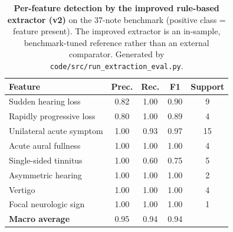 \begin{table}[htbp]
\centering
\caption{\textbf{Per-feature detection by the improved rule-based extractor (v2)} on the 37-note benchmark (positive class = feature present). The improved extractor is an in-sample, benchmark-tuned reference rather than an external comparator. Generated by \texttt{code/src/run\_extraction\_eval.py}.}
\label{tab:extraction}
\small
\begin{tabular}{lcccc}
\toprule
Feature & Prec. & Rec. & F1 & Support \\
\midrule
Sudden hearing loss & 0.82 & 1.00 & 0.90 & 9 \\
Rapidly progressive loss & 0.80 & 1.00 & 0.89 & 4 \\
Unilateral acute symptom & 1.00 & 0.93 & 0.97 & 15 \\
Acute aural fullness & 1.00 & 1.00 & 1.00 & 4 \\
Single-sided tinnitus & 1.00 & 0.60 & 0.75 & 5 \\
Asymmetric hearing & 1.00 & 1.00 & 1.00 & 2 \\
Vertigo & 1.00 & 1.00 & 1.00 & 4 \\
Focal neurologic sign & 1.00 & 1.00 & 1.00 & 1 \\
\midrule
\textbf{Macro average} & 0.95 & 0.94 & 0.94 & \\
\bottomrule
\end{tabular}
\end{table}
